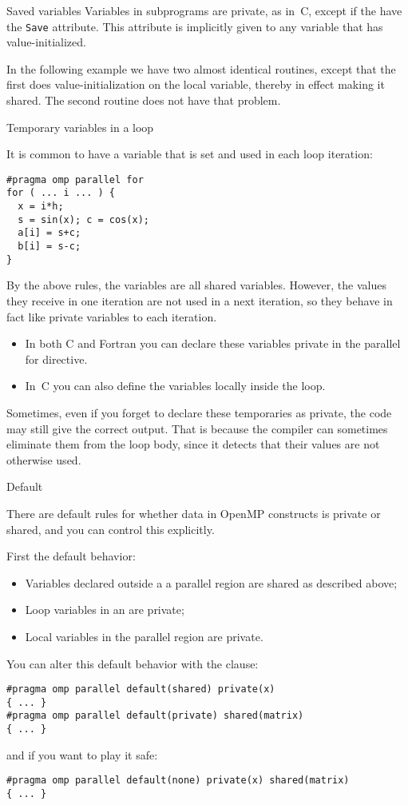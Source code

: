 \begin{fortrannote}{Saved variables}
  Variables in subprograms are private, as in~C,
  except if the have the \lstinline{Save} attribute.
  This attribute is implicitly given to any variable
  that has value-initialized.

  In the following example we have two almost identical routines,
  except that the first does value-initialization on the local variable,
  thereby in effect making it shared. The second routine does not have that problem.
  
\end{fortrannote}

 {Temporary variables in a loop}

It is common to have a variable that is set and used in each loop
iteration:
\begin{lstlisting}
#pragma omp parallel for
for ( ... i ... ) {
  x = i*h;
  s = sin(x); c = cos(x);
  a[i] = s+c;
  b[i] = s-c;
}
\end{lstlisting}
By the above rules, the variables  are all shared
variables. However, the values they receive in one iteration are not
used in a next iteration, so they behave in fact like private
variables to each iteration.
\begin{itemize}
\item In both C and Fortran you can declare these variables private in
  the parallel for directive.
\item In~C you can also define the variables locally inside the loop.
\end{itemize}

Sometimes, even if you forget to declare these temporaries as private,
the code may still give the correct output. That is because the
compiler can sometimes eliminate them from the loop body, since it detects that their
values are not otherwise used.

 {Default}

There are default rules for whether data in OpenMP constructs
is private or shared, and you can control this explicitly.

First the default behavior:
\begin{itemize}
\item Variables declared outside a a parallel region
  are shared as described above;
\item Loop variables in an  are private;
\item Local variables in the parallel region are private.
\end{itemize}
You can alter this default behavior with the  clause:
\begin{lstlisting}
#pragma omp parallel default(shared) private(x)
{ ... }
#pragma omp parallel default(private) shared(matrix)
{ ... }
\end{lstlisting}
and if you want to play it safe:
\begin{lstlisting}
#pragma omp parallel default(none) private(x) shared(matrix)
{ ... }
\end{lstlisting}

